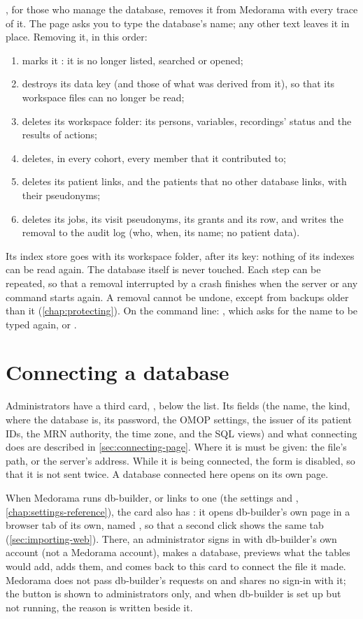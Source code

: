 , for those who manage the database, removes it from Medorama with every trace of
it. The page asks you to type the database's name; any other text leaves it in place. Removing
it, in this order:
\begin{enumerate}
\item marks it : it is no longer listed, searched or opened;
\item destroys its data key (and those of what was derived from it), so that its workspace files
  can no longer be read;
\item deletes its workspace folder: its persons, variables, recordings' status and the results
  of actions;
\item deletes, in every cohort, every member that it contributed to;
\item deletes its patient links, and the patients that no other database links, with their
  pseudonyms;
\item deletes its jobs, its visit pseudonyms, its grants and its row, and writes the removal to
  the audit log (who, when, its name; no patient data).
\end{enumerate}
Its index store goes with its workspace folder, after its key: nothing of its indexes can be read
again. The database itself is never
touched. Each step can be repeated, so that a removal interrupted by a crash finishes when the
server or any command starts again. A removal cannot be undone, except from backups older than it
(\cref{chap:protecting}). On the command line: , which asks
for the name to be typed again, or .

\section{Connecting a database}
\label{sec:databases-tab-connect}

Administrators have a third card, , below the list. Its fields (the name,
the kind, where the database is, its password, the OMOP settings, the issuer of its patient IDs,
the MRN authority, the time zone, and the SQL views) and what connecting does are described in
\cref{sec:connecting-page}. Where it is must be given: the file's path, or the server's address.
While it is being connected, the form is disabled, so that it is not sent twice. A database
connected here opens on its own page.

When Medorama runs db-builder, or links to one (the settings  and
, \cref{chap:settings-reference}), the card also has : it opens db-builder's own page in a browser tab of its own, named
, so that a second click shows the same tab (\cref{sec:importing-web}). There,
an administrator signs in with db-builder's own account (not a Medorama account), makes a
database, previews what the tables would add, adds them, and comes back to this card to connect
the file it made. Medorama does not pass db-builder's requests on and shares no sign-in with it;
the button is shown to administrators only, and when db-builder is set up but not running, the
reason is written beside it.

